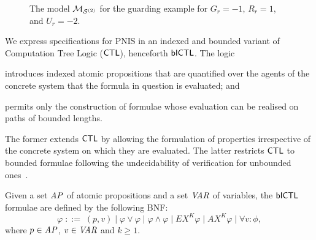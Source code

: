 \begin{example}
\begin{figure}

    \vspace{-0.3cm}
    
    \caption{The model $\mathcal{M}_{\mathcal{S}^{(2)}}$ for the guarding example for $G_r=-1$, $R_r=1$,
      and $U_r=-2$.}
    \label{fig:model-guarding}
  \end{figure}
\end{example}


We express specifications for PNIS in an indexed and bounded variant of
Computation Tree Logic ($\sf{CTL}$), henceforth $\sf{bICTL}$. The logic
\begin{inparaenum}[\it (i)]
\item introduces indexed atomic propositions that are quantified over the
  agents of the concrete system that the formula in question is evaluated; and
\item permits only the construction of formulae whose evaluation can be
  realised on paths of bounded lengths.
\end{inparaenum}
The former extends $\sf{CTL}$ by allowing the formulation of properties
irrespective of the concrete system on which they are evaluated.  The latter
restricts $\sf{CTL}$ to bounded formulae following the undecidability of
verification for unbounded ones~\cite{Akintunde+20}.

\begin{definition}
Given a  set $\it{AP}$ of atomic propositions and a set $\it{VAR}$ of variables,
the $\sf{bICTL}$  formulae are defined by the following BNF:
\[
  \varphi \;   ::= \; (p, v) \mid \varphi \lor \varphi \mid \varphi \land \varphi
  \mid EX^K \varphi \mid AX^K \varphi \mid \forall v \colon \phi,
\]
where  $p \in \it{AP}$, $v \in \it{VAR}$ and $k \geq  1$.
\end{definition}


